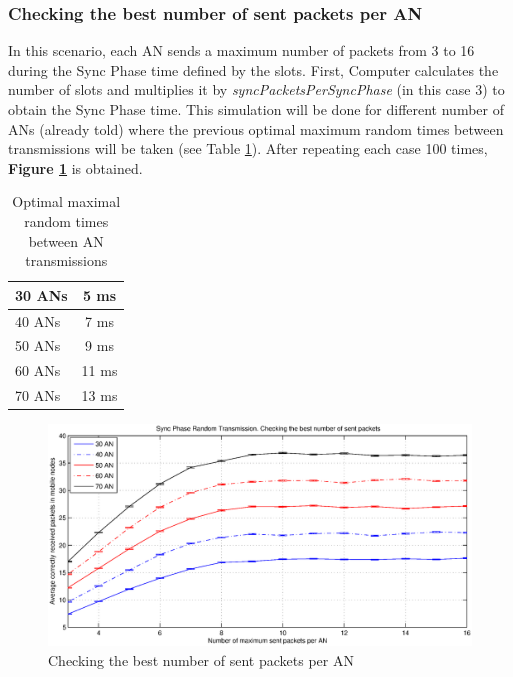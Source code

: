 \subsubsection{Checking the best number of sent packets per \ac{AN}}

In this scenario, each \ac{AN} sends a maximum number of packets from 3 to 16 during the Sync Phase time defined by the slots. First, Computer calculates 
the number of slots and multiplies it by \textit{syncPacketsPerSyncPhase} (in this case 3) to obtain the Sync Phase time. This simulation will be done 
for different number of \acp{AN} (already told) where the previous optimal maximum random times between transmissions will be taken (see Table
\ref{tab:optimalTransmitTimes}). After repeating each case 100 times, \textbf{Figure \ref{fig:randomTimeCheckingTheBestNumberOfSentPacketsForAnchor}} 
is obtained.

\begin{table}
 \begin{center}
  \begin{tabular}{|l|c|}
   \hline
   30 \acp{AN} & 5 ms \\
   \hline
   40 \acp{AN} & 7 ms \\
   \hline
   50 \acp{AN} & 9 ms \\
   \hline
   60 \acp{AN} & 11 ms \\
   \hline
   70 \acp{AN} & 13 ms \\
   \hline
  \end{tabular}
  \caption{Optimal maximal random times between \ac{AN} transmissions}
  \label{tab:optimalTransmitTimes}
 \end{center}
\end{table}

\begin{figure}[ht]
 \begin{center}
  \includegraphics[width=1\textwidth]{randomTimeCheckingTheBestNumberOfSentPacketsForAnchor.eps}
 \end{center}
 \caption{Checking the best number of sent packets per \ac{AN}}
 \label{fig:randomTimeCheckingTheBestNumberOfSentPacketsForAnchor}
\end{figure}

